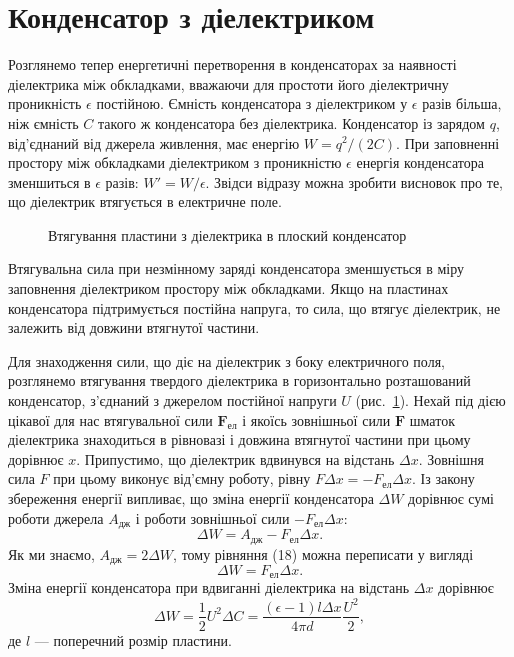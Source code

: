 \documentclass{article}
\begin{document}
\section*{Конденсатор з діелектриком}

Розглянемо тепер енергетичні перетворення в конденсаторах за наявності діелектрика між обкладками, вважаючи для простоти його діелектричну проникність \(\epsilon\) постійною. Ємність конденсатора з діелектриком у \(\epsilon\) разів більша, ніж ємність \(C\) такого ж конденсатора без діелектрика. Конденсатор із зарядом \(q\), від'єднаний від джерела живлення, має енергію \(W = q^2/(2C)\). При заповненні простору між обкладками діелектриком з проникністю \(\epsilon\) енергія конденсатора зменшиться в \(\epsilon\) разів: \(W' = W/\epsilon\). Звідси відразу можна зробити висновок про те, що діелектрик втягується в електричне поле.

\begin{figure}[h]
    \centering
    \caption{Втягування пластини з діелектрика в плоский конденсатор}
    \label{fig:52}
\end{figure}

Втягувальна сила при незмінному заряді конденсатора зменшується в міру заповнення діелектриком простору між обкладками. Якщо на пластинах конденсатора підтримується постійна напруга, то сила, що втягує діелектрик, не залежить від довжини втягнутої частини.

Для знаходження сили, що діє на діелектрик з боку електричного поля, розглянемо втягування твердого діелектрика в горизонтально розташований конденсатор, з'єднаний з джерелом постійної напруги \(U\) (рис.~\ref{fig:52}). Нехай під дією цікавої для нас втягувальної сили \(\mathbf{F}_{\text{ел}}\) і якоїсь зовнішньої сили \(\mathbf{F}\) шматок діелектрика знаходиться в рівновазі і довжина втягнутої частини при цьому дорівнює \(x\). Припустимо, що діелектрик вдвинувся на відстань \(\Delta x\). Зовнішня сила \(F\) при цьому виконує від'ємну роботу, рівну \(F\Delta x = -F_{\text{ел}}\Delta x\). Із закону збереження енергії випливає, що зміна енергії конденсатора \(\Delta W\) дорівнює сумі роботи джерела \(A_{\text{дж}}\) і роботи зовнішньої сили \(-F_{\text{ел}}\Delta x\):
\begin{equation}
    \Delta W = A_{\text{дж}} - F_{\text{ел}} \Delta x.
\end{equation}
Як ми знаємо, \(A_{\text{дж}} = 2\Delta W\), тому рівняння (18) можна переписати у вигляді
\begin{equation}
    \Delta W = F_{\text{ел}} \Delta x.
\end{equation}
Зміна енергії конденсатора при вдвиганні діелектрика на відстань \(\Delta x\) дорівнює
\begin{equation}
    \Delta W = \frac{1}{2} U^2 \Delta C = \frac{(\epsilon - 1)l \Delta x}{4\pi d} \frac{U^2}{2},
\end{equation}
де \(l\) --- поперечний розмір пластини.
\end{document}
